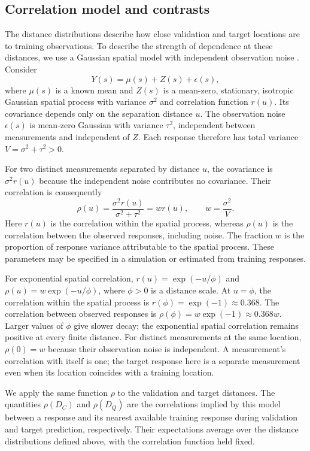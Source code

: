 \subsection{Correlation model and contrasts}
\label{sec:correlation-model}
The distance distributions describe how close validation and target locations are to training observations. To describe the strength of dependence at these distances, we use a Gaussian spatial model with independent observation noise \citep[Chapter~2]{rasmussen2006gpml}. Consider
\[
 Y(s)=\mu(s)+Z(s)+\epsilon(s),
\]
where $\mu(s)$ is a known mean and $Z(s)$ is a mean-zero, stationary, isotropic Gaussian spatial process with variance $\sigma^2$ and correlation function $r(u)$. Its covariance depends only on the separation distance $u$. The observation noise $\epsilon(s)$ is mean-zero Gaussian with variance $\tau^2$, independent between measurements and independent of $Z$. Each response therefore has total variance $V=\sigma^2+\tau^2>0$.

For two distinct measurements separated by distance $u$, the covariance is $\sigma^2r(u)$ because the independent noise contributes no covariance. Their correlation is consequently
\[
 \rho(u)=\frac{\sigma^2r(u)}{\sigma^2+\tau^2}=wr(u),
 \qquad w=\frac{\sigma^2}{V}.
\]
Here $r(u)$ is the correlation within the spatial process, whereas $\rho(u)$ is the correlation between the observed responses, including noise. The fraction $w$ is the proportion of response variance attributable to the spatial process. These parameters may be specified in a simulation or estimated from training responses.

For exponential spatial correlation, $r(u)=\exp(-u/\phi)$ and $\rho(u)=w\exp(-u/\phi)$, where $\phi>0$ is a distance scale. At $u=\phi$, the correlation within the spatial process is $r(\phi)=\exp(-1)\approx0.368$. The correlation between observed responses is $\rho(\phi)=w\exp(-1)\approx0.368w$. Larger values of $\phi$ give slower decay; the exponential spatial correlation remains positive at every finite distance. For distinct measurements at the same location, $\rho(0)=w$ because their observation noise is independent. A measurement's correlation with itself is one; the target response here is a separate measurement even when its location coincides with a training location.

We apply the same function $\rho$ to the validation and target distances. The quantities $\rho(D_C)$ and $\rho(D_Q)$ are the correlations implied by this model between a response and its nearest available training response during validation and target prediction, respectively. Their expectations average over the distance distributions defined above, with the correlation function held fixed.

